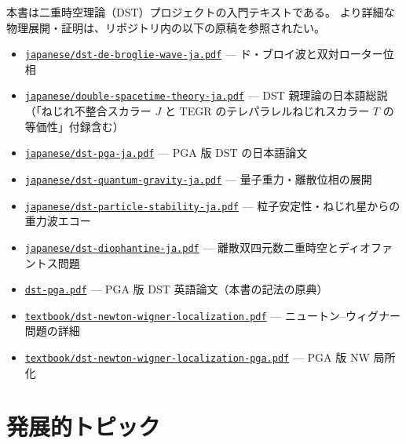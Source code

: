 \documentclass[dvipdfmx,a4paper,oneside]{jsbook}
\numberwithin{equation}{chapter}
\begin{document}
本書は二重時空理論（DST）プロジェクトの入門テキストである。
より詳細な物理展開・証明は、リポジトリ内の以下の原稿を参照されたい。

\begin{itemize}[leftmargin=2em]
  \item \href{https://github.com/hypernumbernet/dual-spacetime-doc/blob/main/japanese/dst-de-broglie-wave-ja.pdf}{\texttt{japanese/dst-de-broglie-wave-ja.pdf}} — ド・ブロイ波と双対ローター位相
  \item \href{https://github.com/hypernumbernet/dual-spacetime-doc/blob/main/japanese/double-spacetime-theory-ja.pdf}{\texttt{japanese/double-spacetime-theory-ja.pdf}} — DST 親理論の日本語総説（「ねじれ不整合スカラー \(J\) と TEGR のテレパラレルねじれスカラー \(T\) の等価性」付録含む）
  \item \href{https://github.com/hypernumbernet/dual-spacetime-doc/blob/main/japanese/dst-pga-ja.pdf}{\texttt{japanese/dst-pga-ja.pdf}} — PGA 版 DST の日本語論文
  \item \href{https://github.com/hypernumbernet/dual-spacetime-doc/blob/main/japanese/dst-quantum-gravity-ja.pdf}{\texttt{japanese/dst-quantum-gravity-ja.pdf}} — 量子重力・離散位相の展開
  \item \href{https://github.com/hypernumbernet/dual-spacetime-doc/blob/main/japanese/dst-particle-stability-ja.pdf}{\texttt{japanese/dst-particle-stability-ja.pdf}} — 粒子安定性・ねじれ星からの重力波エコー
  \item \href{https://github.com/hypernumbernet/dual-spacetime-doc/blob/main/japanese/dst-diophantine-ja.pdf}{\texttt{japanese/dst-diophantine-ja.pdf}} — 離散双四元数二重時空とディオファントス問題
  \item \href{https://github.com/hypernumbernet/dual-spacetime-doc/blob/main/dst-pga.pdf}{\texttt{dst-pga.pdf}} — PGA 版 DST 英語論文（本書の記法の原典）
  \item \href{https://github.com/hypernumbernet/dual-spacetime-doc/blob/main/textbook/dst-newton-wigner-localization.pdf}{\texttt{textbook/dst-newton-wigner-localization.pdf}} — ニュートン--ウィグナー問題の詳細
  \item \href{https://github.com/hypernumbernet/dual-spacetime-doc/blob/main/textbook/dst-newton-wigner-localization-pga.pdf}{\texttt{textbook/dst-newton-wigner-localization-pga.pdf}} — PGA 版 NW 局所化
\end{itemize}

\section{発展的トピック}
\end{document}
